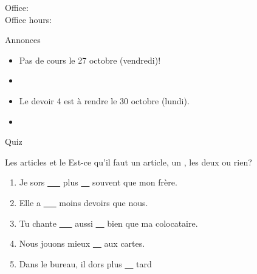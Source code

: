 \documentclass{beamer}
\subtitle[Comparatifs et superlatifs]{Les comparatifs et les superlatifs}
\begin{document}
  \begin{frame}
    \titlepage
    \tiny{Office: \\
          Office hours: }
  \end{frame}

  \begin{frame}{Annonces}
    \begin{itemize}
      \item Pas de cours le 27 octobre (vendredi)!
      \item[] 
      \item Le devoir 4 est à rendre le 30 octobre (lundi).
      \item[] 
    \end{itemize}
  \end{frame}

  \begin{frame}{}
    \begin{center}
      \Large Quiz
    \end{center}
  \end{frame}

  \begin{frame}{Les articles et le }
    Est-ce qu'il faut un article, un , les deux ou rien? \\
    \begin{enumerate}
      \item Je sors \underline{\ \ \ } plus \underline{\ \ } souvent que mon frère.
      \item Elle a \underline{\ \ \ } moins \underline{} devoirs que nous.
      \item Tu chante \underline{\ \ \ } aussi \underline{\ \ } bien que ma colocataire.
      \item Nous jouons \underline{} mieux \underline{\ \ } aux cartes.
      \item Dans le bureau, il dors \underline{} plus \underline{\ \ } tard
    \end{enumerate}
  \end{frame}
\end{document}
